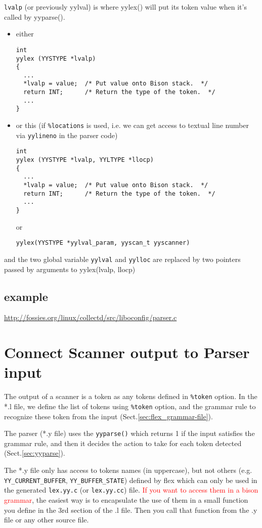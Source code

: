 \verb!lvalp! (or previously yylval) is where yylex() will put its token value
when it's called by yyparse().
\begin{itemize}
  \item either 
\begin{verbatim}
int
yylex (YYSTYPE *lvalp)
{
  ...
  *lvalp = value;  /* Put value onto Bison stack.  */
  return INT;      /* Return the type of the token.  */
  ...
}
\end{verbatim}

  \item or this (if \verb!%locations! is used, i.e. we can get access to
  textual line number via \verb!yylineno! in the parser code)
\begin{verbatim}
int
yylex (YYSTYPE *lvalp, YYLTYPE *llocp)
{
  ...
  *lvalp = value;  /* Put value onto Bison stack.  */
  return INT;      /* Return the type of the token.  */
  ...
}
\end{verbatim}
or
\begin{verbatim}
yylex(YYSTYPE *yylval_param, yyscan_t yyscanner)
\end{verbatim}

\end{itemize}
and the two global variable \verb!yylval! and \verb!yylloc! are replaced by two
pointers passed by arguments to yylex(lvalp, llocp)



\subsection{example}

\url{http://fossies.org/linux/collectd/src/liboconfig/parser.c}

\section{Connect Scanner output to Parser input}
\label{sec:connect-scanner-parser}

The output of a scanner is a token as any tokens defined in \verb!%token!
option. In the *.l file, we define the list of tokens using \verb!%token!
option, and the grammar rule to recognize these token from the input
(Sect.\ref{sec:flex_grammar-file}).

The parser (*.y file) uses the \verb!yyparse()! which returns 1 if the input
satisfies the grammar rule, and then it decides the action to take for each
token detected (Sect.\ref{sec:yyparse}).

The *.y file only has access to tokens names (in uppercase), but not others
(e.g. \verb!YY_CURRENT_BUFFER!, \verb!YY_BUFFER_STATE!) defined by flex which
can only be used in the generated \verb!lex.yy.c! (or \verb!lex.yy.cc!) file.
\textcolor{red}{If you want to access them in a bison grammar}, the easiest way
is to encapsulate the use of them in a small function you define in the 3rd
section of the .l file. Then you call that function from the .y file or any
other source file.



